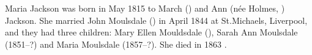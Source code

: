 
Maria Jackson was born in May 1815 to March () and Ann (n\'{e}e Holmes, ) Jackson. She married John Moulsdale () in April 1844 at St.Michaels, Liverpool, and they had three children:
Mary Ellen Mouldsdale (), Sarah Ann Moulsdale (1851--?) and Maria Moulsdale (1857--?).
She died in 1863 \cite{MariaJacksonDeath}.
